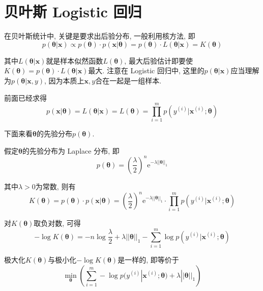 \documentclass[a4paper,UTF8]{ctexart}
\theoremstyle{plain} \newtheorem{theorem}{定理}[section]
\theoremstyle{plain} \newtheorem{definition}{定义}[section]
\theoremstyle{plain} \newtheorem{lemma}{引理}[section]
\theoremstyle{plain} \newtheorem{proposition}{命题}[section]
\theoremstyle{plain} \newtheorem{example}{例}[section]
\theoremstyle{plain} \newtheorem{remark}{注}[section]
\theoremstyle{plain} \newtheorem{corollary}{推论}[section]
\begin{document}
\section{贝叶斯 Logistic 回归}
在贝叶斯统计中, 关键是要求出后验分布, 一般利用核方法, 即
\begin{equation*}
p(\bm{\theta} | \bm{x}) \propto p(\bm{\theta}) \cdot p(\bm{x} | \bm{\theta}) = p(\bm{\theta}) \cdot L(\bm{\theta} | \bm{x}) = K(\bm{\theta})
\end{equation*}

其中$L(\bm{\theta} | \bm{x})$就是样本似然函数$L(\bm{\theta})$, 最大后验估计即要使$K(\bm{\theta}) = p(\bm{\theta}) \cdot L(\bm{\theta | x})$最大. 注意在 Logistic 回归中, 这里的$p(\bm{\theta | x})$应当理解为$p(\bm{\theta | x}, y)$, 因为本质上$\bm{x}, y$合在一起是一组样本.

前面已经求得
\begin{equation*}
p(\bm{x} | \bm{\theta}) = L(\bm{\theta} | \bm{x}) = L(\bm{\theta}) = \prod_{i=1}^{m} p(y^{(i)} | \bm{x}^{(i)}; \bm{\theta})
\end{equation*}

下面来看$\bm{\theta}$的先验分布$p(\bm{\theta})$.

假定$\bm{\theta}$的先验分布为 Laplace 分布, 即
\begin{equation*}
p(\bm{\theta}) = \left(\frac{\lambda}{2} \right)^{n} \mathrm{e}^{-\lambda ||\bm{\theta}||_{1}}
\end{equation*}

其中$\lambda > 0$为常数, 则有
\begin{equation*}
K(\bm{\theta}) = p(\bm{\theta}) \cdot p(\bm{x} | \bm{\theta}) = \left(\frac{\lambda}{2} \right)^{n} \mathrm{e}^{-\lambda ||\bm{\theta}||_{1}} \cdot \prod_{i=1}^{m} p(y^{(i)} | \bm{x}^{(i)}; \bm{\theta})
\end{equation*}

对$K(\bm{\theta})$取负对数, 可得
\begin{equation*}
-\log K(\bm{\theta}) = - n \log \frac{\lambda}{2} + \lambda ||\bm{\theta}||_{1} - \sum_{i=1}^{m} \log p(y^{(i)} | \bm{x}^{(i)}; \bm{\theta})
\end{equation*}

极大化$K(\bm{\theta})$与极小化$- \log K(\bm{\theta})$是一样的, 即等价于
\begin{equation*}
\min_{\bm{\theta}} \left( \sum_{i=1}^{m} - \log p(y^{(i)} | \bm{x}^{(i)}; \bm{\theta}) + \lambda ||\bm{\theta}||_{1} \right)
\end{equation*}
\end{document}
